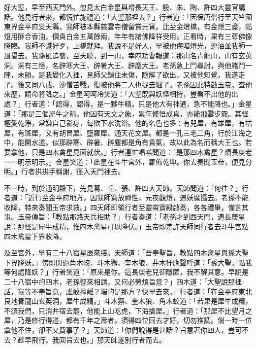 好大聖，早至西天門外。忽見太白金星與增長天王、殷、朱、陶、許四大靈官講話。他見行者來，都慌忙施禮道：「大聖那裡去？」行者道：「因保唐僧行至天竺國東界金平府旻天縣，我師被本縣慈雲寺僧留賞元宵。比至金燈橋，有金燈三盞，點燈用酥合香油，價貴白金五萬餘兩，年年有諸佛降祥受用。正看時，果有三尊佛像降臨。我師不識好歹，上橋就拜。我說不是好人，早被他侮暗燈光，連油並我師一風攝去。我隨風追襲，至天曉，到一山，幸四功曹報道：那山名青龍山，山有玄英洞。洞有三怪，名辟寒大王、辟暑大王、辟塵大王。老孫急上門尋討，與他賭鬥一陣，未勝。是我變化入裡，見師父鎖住未傷，隨解了欲出，又被他知覺，我遂走了。後又同八戒、沙僧苦戰，復被他將二人也捉去綑了。老孫因此特啟玉帝，查他來歷，請命將降之。」金星呵呵冷笑道：「大聖既與妖怪相持，豈看不出他的出處？」行者道：「認得，認得，是一夥牛精。只是他大有神通，急不能降也。」金星道：「那是三個犀牛之精。他因有天文之象，累年修悟成真，亦能飛雲步霧。其怪極愛乾淨，常嫌自己影身，每欲下水洗浴。他的名色也多：有兕犀，有雄犀，有牯犀，有斑犀，又有胡冒犀、墮羅犀、通天花文犀。都是一孔三毛二角，行於江海之中，能開水道。似那辟寒、辟暑、辟塵都是角有貴氣，故以此為名而稱大王也。若要拿他，只是四木禽星見面就伏。」行者連忙唱喏問道：「是那四木禽星？煩長庚老一一明示明示。」金星笑道：「此星在斗牛宮外，羅佈乾坤。你去奏聞玉帝，便見分明。」行者拱拱手稱謝，徑入天門裡去。

不一時，到於通明殿下，先見葛、丘、張、許四大天師。天師問道：「何往？」行者道：「近行至金平府地方，因我師寬放禪性，元夜觀燈，遇妖魔攝去。老孫不能收降，特來奏聞玉帝求救。」四天師即領行者至靈霄寶殿啟奏，各各禮畢，備言其事。玉帝傳旨：「教點那路天兵相助？」行者奏道：「老孫才到西天門，遇長庚星說：那怪是犀牛成精，惟四木禽星可以降伏。」玉帝即差許天師同行者去斗牛宮點四木禽星下界收降。

及至宮外，早有二十八宿星辰來接。天師道：「吾奉聖旨，教點四木禽星與孫大聖下界降妖。」傍即閃過角木蛟、斗木獬、奎木狼、井木犴應聲呼道：「孫大聖，點我等何處降妖？」行者笑道：「原來是你。這長庚老兒卻隱匿，我不解其意。早說是二十八宿中的四木，老孫徑來相請，又何必勞煩旨意？」四木道：「大聖說那裡話，我等不奉旨意，誰敢擅離？端的是那方？快早去來。」行者道：「在金平府東北艮地青龍山玄英洞，犀牛成精。」斗木獬、奎木狼、角木蛟道：「若果是犀牛成精，不須我們，只消井宿去罷，他能上山吃虎，下海擒犀。」行者道：「那犀不比望月之犀，乃是修行得道，都有千年之壽者。須得四位同去才好，切勿推調。倘一時一位拿他不住，卻不又費事了？」天師道：「你們說得是甚話？旨意著你四人，豈可不去？趁早飛行。我回旨去也。」那天師遂別行者而去。

